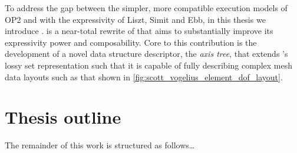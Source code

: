 \documentclass[thesis]{subfiles}
\begin{document}
To address the gap between the simpler, more compatible execution models of OP2 and  with the expressivity of Liszt, Simit and Ebb, in this thesis we introduce .
 is a near-total rewrite of  that aims to substantially improve its expressivity power and composability.
Core to this contribution is the development of a novel data structure descriptor, the \textit{axis tree}, that extends 's lossy set representation such that it is capable of fully describing complex mesh data layouts such as that shown in \cref{fig:scott_vogelius_element_dof_layout}.



\section{Thesis outline}

The remainder of this work is structured as follows\dots
\end{document}
